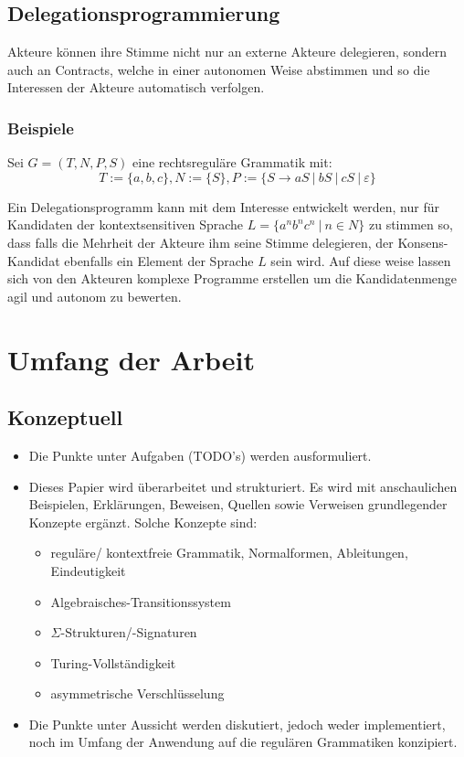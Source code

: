 \documentclass[]{article}
\begin{document}
\subsection{Delegationsprogrammierung}
Akteure können ihre Stimme nicht nur an externe Akteure delegieren, sondern auch an Contracts, welche in einer autonomen Weise abstimmen und so die Interessen der Akteure automatisch verfolgen. 

\subsubsection*{Beispiele}

Sei $G=(T,N,P,S)$ eine rechtsreguläre Grammatik mit:
\[ T:=\{ a, b, c \}, N:=\{S\}, P:= \{S\rightarrow aS\ |\ bS\ |\ cS\ |\ \varepsilon \} \] 

Ein Delegationsprogramm kann mit dem Interesse entwickelt werden, nur für Kandidaten der kontextsensitiven Sprache $L = \{ a^nb^nc^n\ |\ n\in N\}$ zu stimmen so, dass falls die Mehrheit der Akteure ihm seine Stimme delegieren, der Konsens-Kandidat ebenfalls ein Element der Sprache $L$ sein wird. Auf diese weise lassen sich von den Akteuren komplexe Programme erstellen um die Kandidatenmenge agil und autonom zu bewerten.

\section{Umfang der Arbeit}

\subsection*{Konzeptuell}
\begin{itemize}
  \item Die Punkte unter Aufgaben (TODO's) werden ausformuliert.
  \item Dieses Papier wird überarbeitet und strukturiert. Es wird mit anschaulichen Beispielen, Erklärungen, Beweisen,  Quellen sowie Verweisen grundlegender Konzepte ergänzt. Solche Konzepte sind: 
    \begin{itemize}
      \item reguläre/ kontextfreie Grammatik, Normalformen, Ableitungen, Eindeutigkeit
      \item Algebraisches-Transitionssystem
      \item $\Sigma$-Strukturen/-Signaturen
      \item Turing-Vollständigkeit
      \item asymmetrische Verschlüsselung
    \end{itemize}
  \item Die Punkte unter Aussicht werden diskutiert, jedoch weder implementiert, noch im Umfang der Anwendung auf die regulären Grammatiken konzipiert.
\end{itemize}
\end{document}
